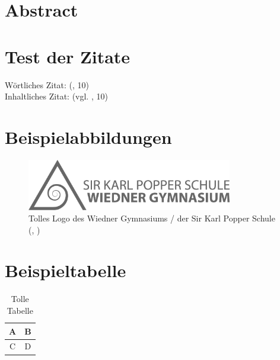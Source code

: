 \documentclass[12pt]{article}
\newcommand{\izit}[2][]{(vgl. \cite{#2}\if#1\empty\else, #1\fi)}
\newcommand{\wzit}[2][]{(\cite{#2}\if#1\empty\else, #1\fi)}
\renewcommand{\abstract}{\section*{Abstract}}
\begin{document}


\abstract
\clearpage
\tableofcontents
\clearpage

\section{Test der Zitate}
Wörtliches Zitat: \wzit[10]{panganos14} \\
Inhaltliches Zitat: \izit[10]{panganos14}

\section{Beispielabbildungen}
\begin{figure}[h!]
    \includegraphics[width=0.8\textwidth]{logo.png}
    \caption{Tolles Logo des Wiedner Gymnasiums / der Sir Karl Popper Schule \wzit{author_fig}}
\end{figure}

\section{Beispieltabelle}
\begin{table}[h!]
    \centering
    \begin{tabular}{|c|c|}
        A & B \\ \hline
        C & D
    \end{tabular}
    \caption{Tolle Tabelle}
\end{table}


\clearpage
\printbibliography[title=\section{Literaturverzeichnis}]
\listoffigures
\listoftables
\end{document}
